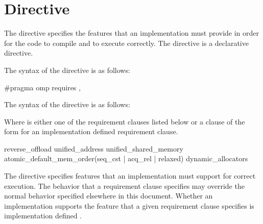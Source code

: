 \section{ Directive}
\label{sec:requires Directive}

\summary The  directive specifies the features that an implementation
must provide in order for the code to compile and to execute correctly.
The  directive is a declarative directive.




\syntax
\begin{ccppspecific}
  The syntax of the  directive is as follows:

\begin{ompcPragma}
  #pragma omp requires \plc{clause[ [ [},\plc{] clause] ... ] new-line}

\end{ompcPragma}

\end{ccppspecific}

\begin{fortranspecific}
  The syntax of the  directive is as follows:


\end{fortranspecific}

Where  is either one of the requirement clauses listed below or a
clause of the form {} for an
implementation defined requirement clause.

\begin{indentedcodelist}
reverse_offload
unified_address
unified_shared_memory
atomic_default_mem_order(seq_cst \textnormal{|} acq_rel \textnormal{|} relaxed)
dynamic_allocators
\end{indentedcodelist}

\descr

The  directive specifies features that an implementation must
support for correct execution. The behavior that a requirement clause specifies
may override the normal behavior specified elsewhere in this document. Whether 
an implementation supports the feature that a given requirement clause specifies 
is implementation defined .

